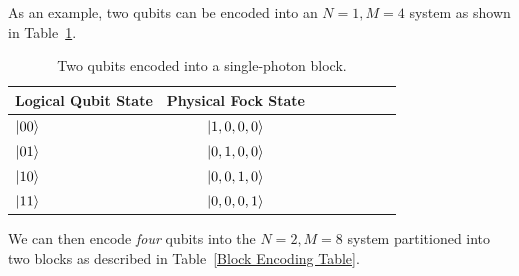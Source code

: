 \documentclass[aps,pra,twocolumn,showpacs,superscriptaddress,floatfix,10pt]{revtex4}
\begin{document}
As an example, two qubits can be encoded into an $N=1,M=4$ system as shown in Table~\ref{Two Qubit Encoding Table}.
\begin {table}[h]
\begin{center}
	\begin{tabular}{l*{6}{c}r} 
		Logical Qubit State      \quad \quad \quad     & Physical Fock State \\
		\hline 
		\quad \quad \quad $\ket{00}$     & $\ket{1,0,0,0}$ \\
		\quad \quad \quad $\ket{01}$            & $\ket{0,1,0,0}$ \\
		\quad \quad \quad $\ket{10}$            & $\ket{0,0,1,0}$ \\
		\quad \quad \quad $\ket{11}$            & $\ket{0,0,0,1}$ \\
	\end{tabular}
	\caption{ \label{Two Qubit Encoding Table} Two qubits encoded into a single-photon block.}
\end{center}
\end{table}
We can then encode \textit{four} qubits into the $N=2,M=8$ system partitioned into two blocks as described in Table~\ref{Block Encoding Table}.
\end{document}
